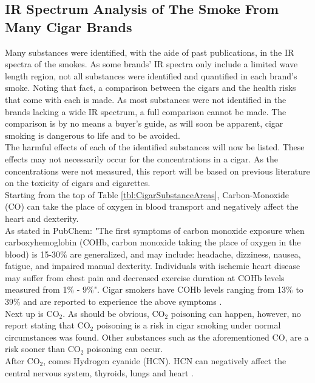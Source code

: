 \documentclass[reprint,amsmath,amssymb,aps, prl]{revtex4-2}
\begin{document}
\subsection{IR Spectrum Analysis of The Smoke From Many Cigar Brands}
Many substances were identified, with the aide of past publications, in the IR spectra of the smokes. As some brands' IR spectra only include a limited wave length region, not all substances were identified and quantified in each brand's smoke.
Noting that fact, a comparison between the cigars and the health risks that come with each is made. As most substances were not identified in the brands lacking a wide IR spectrum, a full comparison cannot be made. The comparison is by no means a buyer's guide, as will soon be apparent, cigar smoking is dangerous to life and to be avoided.\\
The harmful effects of each of the identified substances will now be listed. These effects may not necessarily occur for the concentrations in a cigar. As the concentrations were not measured, this report will be based on previous literature on the toxicity of cigars and cigarettes.\\
Starting from the top of Table \ref{tbl:CigarSubstanceAreas}, Carbon-Monoxide (CO) can take the place of oxygen in blood transport and negatively affect the heart \cite{SubstanceDangerPaper} and dexterity.\\
As stated in PubChem\cite{PubChemCO}: "The first symptoms of carbon monoxide exposure when carboxyhemoglobin (COHb, carbon monoxide taking the place of oxygen in the blood) is 15-30$\%$ are generalized, and may include: headache, dizziness, nausea, fatigue, and impaired manual dexterity. Individuals with ischemic heart disease may suffer from chest pain and decreased exercise duration at COHb levels measured from 1$\%$ - 9$\%$". Cigar smokers have COHb levels ranging from 13\% to 39\% and are reported to experience the above symptoms \cite{COHbInSmokers}.\\
Next up is $\text{CO}_{2}$. As should be obvious, $\text{CO}_{2}$ poisoning can happen, however, no report stating that $\text{CO}_{2}$ poisoning is a risk in cigar smoking under normal circumstances was found. Other substances such as the aforementioned CO, are a risk sooner than $\text{CO}_{2}$ poisoning can occur.\\
After $\text{CO}_{2}$, comes Hydrogen cyanide (HCN). HCN can negatively affect the central nervous system, thyroids, lungs and heart \cite{SubstanceDangerPaper}\cite{PubChemHCN}.\\
\end{document}
